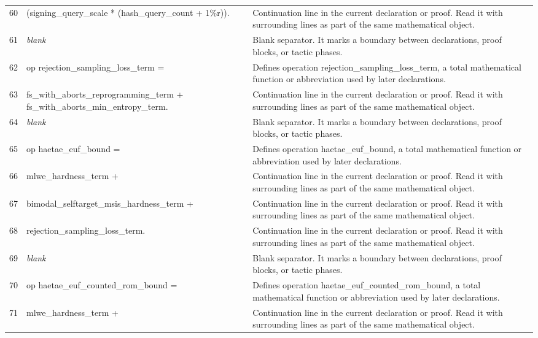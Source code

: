 \documentclass[10pt]{article}
\begin{document}
\begin{longtable}{r L{0.53\textwidth} L{0.37\textwidth}}
60 & {\ttfamily\scriptsize     (signing\_query\_scale * (hash\_query\_count + 1\%r)).} & Continuation line in the current declaration or proof.  Read it with surrounding lines as part of the same mathematical object. \\
61 & {\ttfamily\scriptsize \emph{blank}} & Blank separator.  It marks a boundary between declarations, proof blocks, or tactic phases. \\
62 & {\ttfamily\scriptsize op rejection\_sampling\_loss\_term =} & Defines operation rejection\_sampling\_loss\_term, a total mathematical function or abbreviation used by later declarations. \\
63 & {\ttfamily\scriptsize   fs\_with\_aborts\_reprogramming\_term + fs\_with\_aborts\_min\_entropy\_term.} & Continuation line in the current declaration or proof.  Read it with surrounding lines as part of the same mathematical object. \\
64 & {\ttfamily\scriptsize \emph{blank}} & Blank separator.  It marks a boundary between declarations, proof blocks, or tactic phases. \\
65 & {\ttfamily\scriptsize op haetae\_euf\_bound =} & Defines operation haetae\_euf\_bound, a total mathematical function or abbreviation used by later declarations. \\
66 & {\ttfamily\scriptsize   mlwe\_hardness\_term +} & Continuation line in the current declaration or proof.  Read it with surrounding lines as part of the same mathematical object. \\
67 & {\ttfamily\scriptsize   bimodal\_selftarget\_msis\_hardness\_term +} & Continuation line in the current declaration or proof.  Read it with surrounding lines as part of the same mathematical object. \\
68 & {\ttfamily\scriptsize   rejection\_sampling\_loss\_term.} & Continuation line in the current declaration or proof.  Read it with surrounding lines as part of the same mathematical object. \\
69 & {\ttfamily\scriptsize \emph{blank}} & Blank separator.  It marks a boundary between declarations, proof blocks, or tactic phases. \\
70 & {\ttfamily\scriptsize op haetae\_euf\_counted\_rom\_bound =} & Defines operation haetae\_euf\_counted\_rom\_bound, a total mathematical function or abbreviation used by later declarations. \\
71 & {\ttfamily\scriptsize   mlwe\_hardness\_term +} & Continuation line in the current declaration or proof.  Read it with surrounding lines as part of the same mathematical object. \\

\end{longtable}
\end{document}
